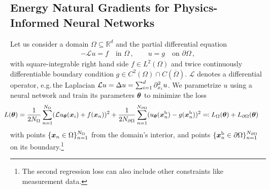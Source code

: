 \subsection{Energy Natural Gradients for Physics-Informed Neural Networks}
Let us consider a domain $\Omega\subseteq\mathbb R^d$ and the partial differential equation
\begin{align*}
  -\mathcal{L} u = f \quad \text{in }\Omega\,,
                   \qquad
  u = g \quad \text{on }\partial\Omega\,,
\end{align*}
with square-integrable right hand side $f\in L^2(\Omega)$ and twice continuously differentiable boundary condition $g\in C^2(\Omega)\cap C(\overline{\Omega})$.
$\mathcal{L}$ denotes a differential operator, e.g.\,the Laplacian $\mathcal{L} u = \Delta u = \sum_{i=1}^d \partial_{{x}_i}^2 u$.
We parametrize $u$ using a neural network and train its parameters ${\bm{\theta}}$ to minimize the loss
\begin{align}\label{eq:pinn-loss}
  \!\!\!\!\!\!
  L({\bm{\theta}})
  &=
    \frac{1}{2N_\Omega} \sum_{n=1}^{N_\Omega} (\mathcal{L} u_{\bm{\theta}}({\bm{x}}_i) + f({\bm{x}}_n))^2
    +
    \frac{1}{2N_{\partial\Omega}}\sum_{n=1}^{N_{\partial\Omega}} ( u_{\bm{\theta}}({\bm{x}}^\text{b}_n) - g({\bm{x}}^\text{b}_n))^2
    \eqqcolon
    L_\Omega({\bm{\theta}}) + L_{\partial\Omega}({\bm{\theta}})
\end{align}
with points $\{{\bm{x}}_n \in \Omega \}_{n=1}^{N_\Omega}$ from the domain's interior, and points $\{{\bm{x}}^\text{b}_n \in \partial\Omega \}_{n=1}^{N_{\partial\Omega}}$ on its boundary.\footnote{The second regression loss can also include other constraints like measurement data.}

